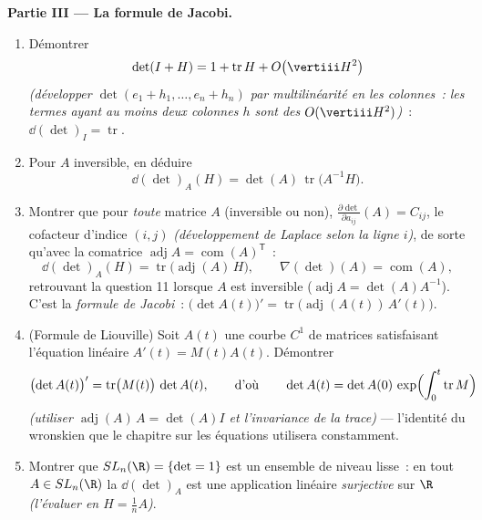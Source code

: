\begin{problem}
\medskip
\noindent\textbf{Partie III --- La formule de Jacobi.}
\begin{enumerate}[resume]
  \item Démontrer
        \[
        \det(I + H) = 1 + \operatorname{tr}H +
        O\bigl(\vertiii H^2\bigr)
        \]
        \emph{(développer $\det(e_1 + h_1, \dots, e_n + h_n)$ par
        multilinéarité en les colonnes~: les termes ayant au moins
        deux colonnes $h$ sont des $O(\vertiii H^2)$)}~: $\dd(\det)_I =
        \operatorname{tr}$.
  \item Pour $A$ inversible, en déduire
        \[
        \dd(\det)_A(H) = \det(A)\,
        \operatorname{tr}\bigl(A^{-1}H\bigr) .
        \]
  \item Montrer que pour \emph{toute} matrice $A$ (inversible ou
        non), $\frac{\partial\det}{\partial a_{ij}}(A) = C_{ij}$, le
        cofacteur d'indice $(i,j)$ \emph{(développement de Laplace
        selon la ligne $i$)}, de sorte qu'avec la comatrice
         $\operatorname{adj}A =
        \operatorname{com}(A)^{\mathsf T}$~:
        \[
        \dd(\det)_A(H) =
        \operatorname{tr}\bigl(\operatorname{adj}(A)\,H\bigr),
        \qquad
        \nabla(\det)(A) = \operatorname{com}(A) ,
        \]
        retrouvant la question 11 lorsque $A$ est inversible
        ($\operatorname{adj}A = \det(A)A^{-1}$). C'est la
        \emph{formule de Jacobi}~: $\bigl(\det
        A(t)\bigr)' = \operatorname{tr}\bigl(
        \operatorname{adj}(A(t))\,A'(t)\bigr)$.
  \item (Formule de Liouville) Soit $A(t)$ une courbe $C^1$ de
        matrices satisfaisant l'équation  linéaire
        $A'(t) = M(t)A(t)$. Démontrer
        \[
        \bigl(\det A(t)\bigr)' =
        \operatorname{tr}\bigl(M(t)\bigr)\,\det A(t),
        \qquad\text{d'où}\qquad
        \det A(t) = \det A(0)\,
        \exp\Bigl(\int_0^t\operatorname{tr}M\Bigr)
        \]
        \emph{(utiliser $\operatorname{adj}(A)\,A = \det(A)I$ et
        l'invariance  de la trace)} --- l'identité du
        wronskien que le chapitre sur les équations 
        utilisera constamment.
  \item Montrer que $SL_n(\R) = \{\det = 1\}$ est un ensemble de
        niveau lisse~: en tout $A \in SL_n(\R)$ la 
        $\dd(\det)_A$ est une application linéaire \emph{surjective}
        sur $\R$ \emph{(l'évaluer en $H = \frac1nA$)}.
\end{enumerate}


\end{problem}
